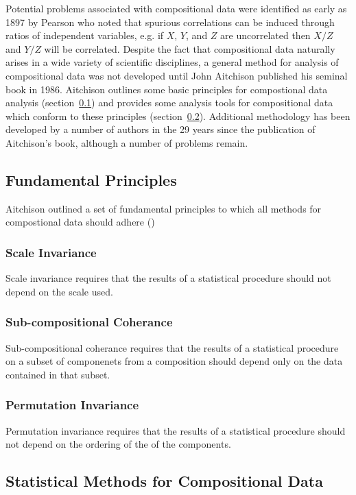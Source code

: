\documentclass{book}\usepackage[]{graphicx}\usepackage[]{color}
\begin{document}
Potential problems associated with compositional data were identified as early as 1897 by Pearson who noted that spurious correlations can be induced through ratios of independent variables, e.g. if $X$, $Y$, and $Z$ are uncorrelated then $X/Z$ and $Y/Z$ will be correlated. Despite the fact that compositional data naturally arises in a wide variety of scientific disciplines, a general method for analysis of compositional data was not developed until John Aitchison published his seminal book in 1986.  Aitchison outlines some basic principles for compostional data analysis (section~\ref{subsec:fund}) and provides some analysis tools for compositional data which conform to these principles (section~\ref{subsec:methods}).  Additional methodology has been developed by a number of authors in the 29 years since the publication of Aitchison's book, although a number of problems remain. 

\subsection{Fundamental Principles}
\label{subsec:fund}
Aitchison outlined a set of fundamental principles to which all methods for compostional data should adhere (\cite{Aitchison1986})

\subsubsection{Scale Invariance}
Scale invariance requires that the results of a statistical procedure should not depend on the scale used.

\subsubsection{Sub-compositional Coherance}
Sub-compositional coherance requires that the results of a statistical procedure on a subset of componenets from a composition should depend only on the data contained in that subset.

\subsubsection{Permutation Invariance}
Permutation invariance requires that the results of a statistical procedure should not depend on the ordering of the of the components. 
\subsection{Statistical Methods for Compositional Data}
\label{subsec:methods}
\end{document}
